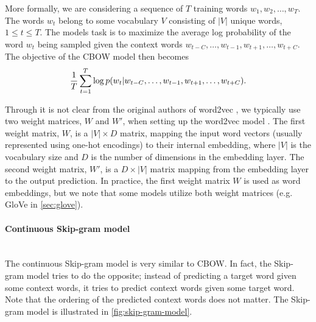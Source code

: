 More formally, we are considering a sequence of $T$ training words $w_1, w_2, \ldots, w_T$. The words $w_t$ belong to some vocabulary $V$ consisting of $|V|$ unique words, $1 \leq t \leq T$. The models task is to maximize the average log probability of the word $w_t$ being sampled given the context words $w_{t-C}, \ldots, w_{t-1}, w_{t+1}, \ldots, w_{t+C}$. The objective of the CBOW model then becomes
\begin{align}
    \frac{1}{T} \sum\limits_{t=1}^{T} \log p(w_t | w_{t-C}, \ldots, w_{t-1}, w_{t+1}, \ldots, w_{t+C}).
    \label{eqn:cbow-objective-function}
\end{align}

Through it is not clear from the original authors of word2vec \cite{mikolov2013a, mikolov2013b}, we typically use two weight matrices, $W$ and $W'$, when setting up the word2vec model \cite{rong2016word2vec}. The first weight matrix, $W$, is a $|V| \times D$ matrix, mapping the input word vectors (usually represented using one-hot encodings) to their internal embedding, where $|V|$ is the vocabulary size and $D$ is the number of dimensions in the embedding layer. The second weight matrix, $W'$, is a $D \times |V|$ matrix mapping from the embedding layer to the output prediction. In practice, the first weight matrix $W$ is used as word embeddings, but we note that some models utilize both weight matrices (e.g. GloVe in \cref{sec:glove}).

\paragraph*{Continuous Skip-gram model}\mbox{} \\
The continuous Skip-gram model is very similar to CBOW. In fact, the Skip-gram model tries to do the opposite; instead of predicting a target word given some context words, it tries to predict context words given some target word. Note that the ordering of the predicted context words does not matter. The Skip-gram model is illustrated in \cref{fig:skip-gram-model}.

